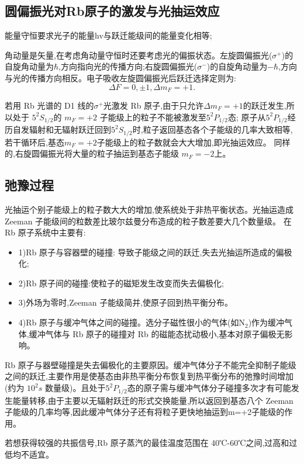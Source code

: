 \documentclass[12pt, a4paper]{article}
\begin{document}
\subsection{圆偏振光对Rb原子的激发与光抽运效应}
能量守恒要求光子的能量hv与跃迁能级间的能量变化相等;

角动量是矢量,在考虑角动量守恒时还要考虑光的偏振状态。左旋圆偏振光($\sigma^+$)的自旋角动量为$\hbar$,方向指向光的传播方向;右旋圆偏振光($\sigma^-$)的自旋角动量为$-\hbar$,方向与光的传播方向相反。电子吸收左旋圆偏振光后跃迁选择定则为:
\begin{equation}
\Delta F = 0, \pm 1, \Delta m_F = +1.
\end{equation}

若用 Rb 光谱的 D1 线的$\sigma^+$光激发 Rb 原子,由于只允许$\Delta m_F=+1$的跃迁发生,所以处于 $5^2S_{1/2}$的 $m_F=+2$ 子能级上的粒子不能被激发至$5^2P_{1/2}$态; 原子从$5^2P_{1/2}$经历自发辐射和无辐射跃迁回到$5^2S_{1/2}$时,粒子返回基态各个子能级的几率大致相等,若干循环后,基态$m_F=+2$子能级上的粒子数就会大大增加,即光抽运效应。
同样的,右旋圆偏振光将大量的粒子抽运到基态子能级 $m_F =-2$上。

\subsection{弛豫过程}
光抽运个别子能级上的粒子数大大的增加,使系统处于非热平衡状态。光抽运造成 Zeeman 子能级间的粒数差比玻尔兹曼分布造成的粒子数差要大几个数量级。
在Rb 原子系统中主要有:
\begin{itemize}
    \item 1)Rb 原子与容器壁的碰撞: 导致子能级之间的跃迁,失去光抽运所造成的偏极化;
    \item 2)Rb 原子间的碰撞:使粒子的磁矩发生改变而失去偏极化;
    \item 3)外场为零时,Zeeman 子能级简并,使原子回到热平衡分布。
    \item 4)Rb 原子与缓冲气体之间的碰撞。选分子磁性很小的气体(如N$_2$)作为缓冲气体,缓冲气体与 Rb 原子的碰撞对 Rb 的磁能态扰动极小,基本对原子偏极无影响。
\end{itemize}

Rb 原子与器壁碰撞是失去偏极化的主要原因。缓冲气体分子不能完全抑制子能级之间的跃迁,主要作用是使基态由非热平衡分布恢复到热平衡分布的弛豫时间增加(约为 $10^2s$ 数量级)。且处于$5^2P_{1/2}$态的原子需与缓冲气体分子碰撞多次才有可能发生能量转移,由于主要以无辐射跃迁的形式交换能量,所以返回到基态八个 Zeeman 子能级的几率均等,因此缓冲气体分子还有将粒子更快地抽运到m=+2子能级的作用。

若想获得较强的共振信号,Rb 原子蒸汽的最佳温度范围在 40℃-60℃之间,过高和过低均不适宜。
\end{document}
